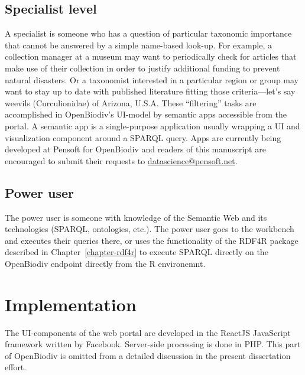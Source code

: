 \subsection{Specialist level}

A specialist is someone who has a question of particular taxonomic importance that cannot be answered by a simple name-based look-up. For example, a collection manager at a museum may want to periodically check for articles that make use of their collection in order to justify additional funding to prevent natural disasters. Or a taxonomist interested in a particular region or group may want to stay up to date with published literature fitting those criteria---let's say weevils (Curculionidae) of Arizona, U.S.A. These ``filtering'' tasks are accomplished in OpenBiodiv's UI-model by semantic apps accessible from the portal. A semantic app is a single-purpose application usually wrapping a UI and visualization component around a SPARQL query. Apps are currently being developed at Pensoft for OpenBiodiv and readers of this manuscript are encouraged to submit their requests to \url{datascience@pensoft.net}.

\subsection{Power user}

The power user is someone with knowledge of the Semantic Web and its technologies (SPARQL, ontologies, etc.). The power user goes to the workbench and executes their queries there, or uses the functionality of the RDF4R package described in Chapter~\ref{chapter-rdf4r} to execute SPARQL directly on the OpenBiodiv endpoint directly from the R environemnt.

\section{Implementation}

The UI-components of the web portal are developed in the ReactJS JavaScript framework written by Facebook. Server-side processing is done in PHP. This part of OpenBiodiv is omitted from a detailed discussion in the present dissertation effort.
